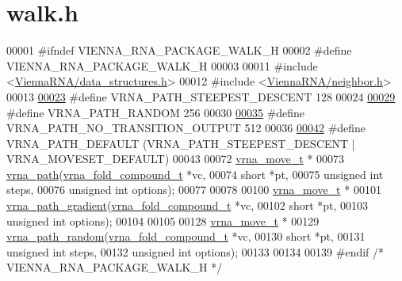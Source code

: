 \hypertarget{walk_8h_source}{}\section{walk.\+h}
\label{walk_8h_source}

\begin{DoxyCode}
00001 \textcolor{preprocessor}{#ifndef VIENNA\_RNA\_PACKAGE\_WALK\_H}
00002 \textcolor{preprocessor}{#define VIENNA\_RNA\_PACKAGE\_WALK\_H}
00003 
00011 \textcolor{preprocessor}{#include <\mbox{\hyperlink{data__structures_8h}{ViennaRNA/data\_structures.h}}>}
00012 \textcolor{preprocessor}{#include <\mbox{\hyperlink{neighbor_8h}{ViennaRNA/neighbor.h}}>}
00013 
\mbox{\hyperlink{group__paths_ga705cea2b3243a38a2d6e3b1e141ed061}{00023}} \textcolor{preprocessor}{#define  VRNA\_PATH\_STEEPEST\_DESCENT 128}
00024 
\mbox{\hyperlink{group__paths_ga0b84bd36bfd783130297797c51dd85ae}{00029}} \textcolor{preprocessor}{#define  VRNA\_PATH\_RANDOM           256}
00030 
\mbox{\hyperlink{group__paths_ga1ee63e54ecf136491e12ff03ede2622d}{00035}} \textcolor{preprocessor}{#define  VRNA\_PATH\_NO\_TRANSITION\_OUTPUT          512}
00036 
\mbox{\hyperlink{group__paths_gaf1bb1f8fec8d24e3b821f621b19f77b4}{00042}} \textcolor{preprocessor}{#define VRNA\_PATH\_DEFAULT   (VRNA\_PATH\_STEEPEST\_DESCENT | VRNA\_MOVESET\_DEFAULT)}
00043 
00072 \mbox{\hyperlink{group__neighbors_structvrna__move__s}{vrna\_move\_t}} *
00073 \mbox{\hyperlink{group__paths_gab6aee4143f8b103518d5cbfe6bfe5eae}{vrna\_path}}(\mbox{\hyperlink{group__fold__compound_structvrna__fc__s}{vrna\_fold\_compound\_t}}  *vc,
00074           \textcolor{keywordtype}{short}                 *pt,
00075           \textcolor{keywordtype}{unsigned} \textcolor{keywordtype}{int}          steps,
00076           \textcolor{keywordtype}{unsigned} \textcolor{keywordtype}{int}          options);
00077 
00078 
00100 \mbox{\hyperlink{group__neighbors_structvrna__move__s}{vrna\_move\_t}} *
00101 \mbox{\hyperlink{group__paths_gae92cce443a8a64f7b7fb89867b7d6125}{vrna\_path\_gradient}}(\mbox{\hyperlink{group__fold__compound_structvrna__fc__s}{vrna\_fold\_compound\_t}} *vc,
00102                    \textcolor{keywordtype}{short}                *pt,
00103                    \textcolor{keywordtype}{unsigned} \textcolor{keywordtype}{int}         options);
00104 
00105 
00128 \mbox{\hyperlink{group__neighbors_structvrna__move__s}{vrna\_move\_t}} *
00129 \mbox{\hyperlink{group__paths_ga9234756c337078fa599529d3db70d913}{vrna\_path\_random}}(\mbox{\hyperlink{group__fold__compound_structvrna__fc__s}{vrna\_fold\_compound\_t}} *vc,
00130                  \textcolor{keywordtype}{short}                *pt,
00131                  \textcolor{keywordtype}{unsigned} \textcolor{keywordtype}{int}         steps,
00132                  \textcolor{keywordtype}{unsigned} \textcolor{keywordtype}{int}         options);
00133 
00134 
00139 \textcolor{preprocessor}{#endif }\textcolor{comment}{/* VIENNA\_RNA\_PACKAGE\_WALK\_H */}\textcolor{preprocessor}{}
\end{DoxyCode}
